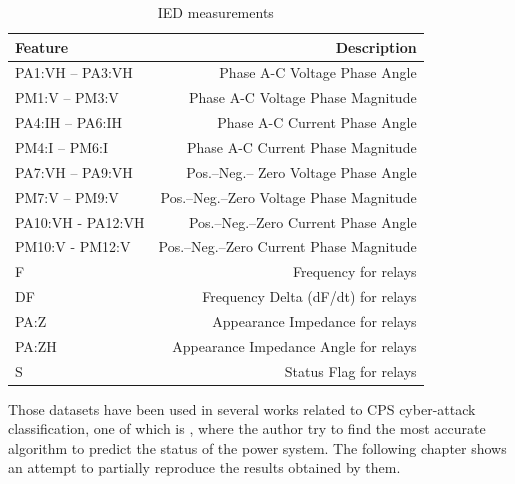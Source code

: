 \begin{table}[H]
    \centering
    \caption[IED measurements]{IED measurements \cite{adhikari_power_2014}} \label{tab:pmu_mes}
    \begin{tabular}{lr}
        \toprule
        Feature&Description \\
        \midrule
        PA1:VH – PA3:VH&Phase A-C Voltage Phase Angle \\
        PM1:V – PM3:V&Phase A-C Voltage Phase Magnitude \\
        PA4:IH – PA6:IH&Phase A-C Current Phase Angle \\
        PM4:I – PM6:I&Phase A-C Current Phase Magnitude \\
        PA7:VH – PA9:VH&Pos.–Neg.– Zero Voltage Phase Angle \\
        PM7:V – PM9:V&Pos.–Neg.–Zero Voltage Phase Magnitude \\
        PA10:VH - PA12:VH&Pos.–Neg.–Zero Current Phase Angle \\
        PM10:V - PM12:V&Pos.–Neg.–Zero Current Phase Magnitude \\
        F&Frequency for relays \\
        DF&Frequency Delta (dF/dt) for relays \\
        PA:Z&Appearance Impedance for relays \\
        PA:ZH&Appearance Impedance Angle for relays \\
        S&Status Flag for relays \\
        \bottomrule
    \end{tabular}
\end{table} 


Those datasets have been used in several works related to CPS cyber-attack classification, one of which is \cite{borges_hink_machine_2014-1}, where the author try to find the most accurate algorithm to predict the status of the power system. The following chapter shows an attempt to partially reproduce the results obtained by them.
